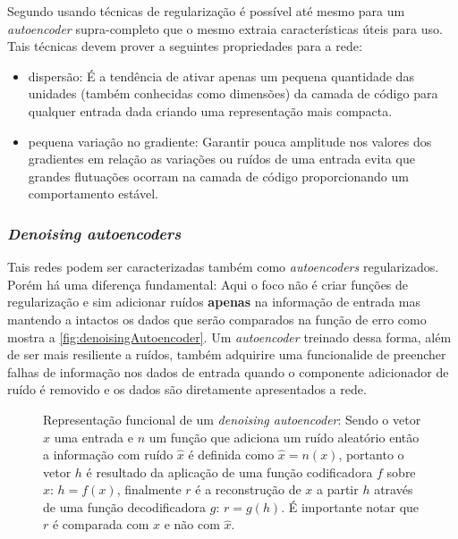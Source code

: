 				\par Segundo \cite{Goodfellow-et-al-2016} usando técnicas de regularização é possível até mesmo para um \textit{autoencoder} supra-completo que o mesmo extraia características úteis para uso. Tais técnicas devem prover a seguintes propriedades para a rede:
				
				\begin{itemize}
					\item dispersão: É a tendência de ativar apenas um pequena quantidade das unidades (também conhecidas como dimensões) da camada de código para qualquer entrada dada criando uma representação mais compacta.
					\item pequena variação no gradiente: Garantir pouca amplitude nos valores dos gradientes em relação as variações ou ruídos de uma entrada evita que grandes flutuações ocorram na camada de código proporcionando um comportamento estável.
				\end{itemize}

				
			\subsubsection{\textit{Denoising autoencoders}}
				\par Tais redes podem ser caracterizadas também como \textit{autoencoders} regularizados. Porém há uma diferença fundamental: Aqui o foco não é criar funções de regularização e sim adicionar ruídos \textbf{apenas} na informação de entrada mas mantendo a intactos os dados que serão comparados na função de erro como mostra a  \autoref{fig:denoisingAutoencoder}. Um \textit{autoencoder} treinado dessa forma, além de ser mais resiliente a ruídos, também adquirire uma funcionalide de preencher falhas de informação nos dados de entrada quando o componente adicionador de ruído é removido e os dados são diretamente apresentados a rede.
				
				\begin{figure}[h]
					\centering
					\caption[Representação funcional de um \textit{denoising autoencoder}]{Representação funcional de um \textit{denoising autoencoder}: Sendo o vetor $x$ uma entrada e $n$ um função que adiciona um ruído aleatório então a informação com ruído $\hat{x}$ é definida como $\hat{x} = n(x)$, portanto o vetor $h$ é resultado da aplicação de uma função codificadora $f$ sobre $x$: $h = f(x)$, finalmente $r$ é a reconstrução de $x$ a partir $h$ através de uma função decodificadora $g$: $r = g(h)$. É importante notar que $r$ é comparada com $x$ e não com $\hat{x}$.}
					
					\label{fig:denoisingAutoencoder}
				\end{figure}
							

